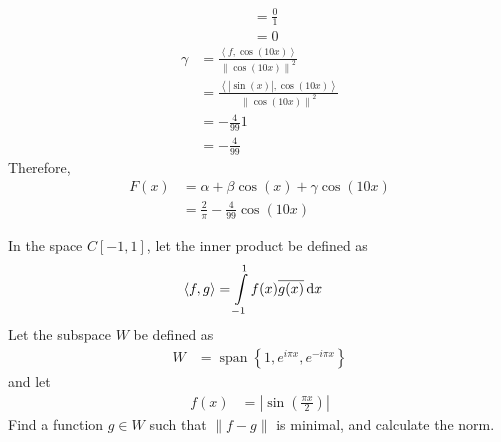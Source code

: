 \documentclass[fleqn, a4paper, 11pt, oneside]{amsart}
\theoremstyle{definition}
\theoremstyle{theorem}
\DeclareMathOperator{\setspan}{span}
\begin{document}
\begin{solution}
\begin{enumerate}
\begin{align*}
				&= \frac{0}{1}\\
				&= 0
			\end{align*}
			\begin{align*}
				\gamma &= \frac{\left\langle f,\cos(10 x) \right\rangle}{\left\| \cos(10 x) \right\|^2}\\
				&= \frac{\left\langle \left| \sin(x) \right|,\cos(10 x) \right\rangle}{\left\| \cos(10 x) \right\|^2}\\
				&= -{\frac{4}{99}}{1}\\
				&= -\frac{4}{99}
			\end{align*}
			Therefore,
			\begin{align*}
				F(x) &= \alpha + \beta \cos(x) + \gamma \cos(10 x)\\
				&= \frac{2}{\pi} - \frac{4}{99} \cos(10 x)
			\end{align*}
	\end{enumerate}
\end{solution}

\begin{question}
	In the space $C[-1,1]$, let the inner product be defined as
	\begin{align*}
		\langle f,g \rangle &= \int\limits_{-1}^{1} f(x) \overline{g(x)} \dif x
	\end{align*}
	Let the subspace $W$ be defined as
	\begin{align*}
		W &= \setspan\left\{ 1,e^{i \pi x},e^{-i \pi x} \right\}
	\end{align*}
	and let
	\begin{align*}
		f(x) &= \left| \sin\left( \frac{\pi x}{2} \right) \right|
	\end{align*}
	Find a function $g \in W$ such that $\|f - g\|$ is minimal, and calculate the norm.
\end{question}
\end{document}
